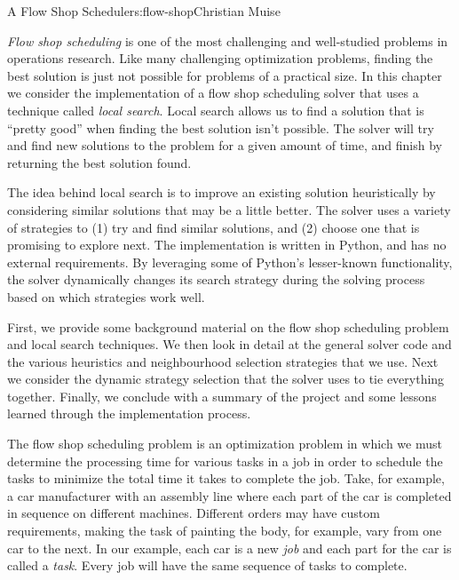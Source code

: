 \begin{aosachapter}{A Flow Shop Scheduler}{s:flow-shop}{Christian Muise}

\label{a-flow-shop-scheduler}

\emph{Flow shop scheduling} is one of the most challenging and
well-studied problems in operations research. Like many challenging
optimization problems, finding the best solution is just not possible
for problems of a practical size. In this chapter we consider the
implementation of a flow shop scheduling solver that uses a technique
called \emph{local search}. Local search allows us to find a solution
that is ``pretty good'' when finding the best solution isn't possible.
The solver will try and find new solutions to the problem for a given
amount of time, and finish by returning the best solution found.

The idea behind local search is to improve an existing solution
heuristically by considering similar solutions that may be a little
better. The solver uses a variety of strategies to (1) try and find
similar solutions, and (2) choose one that is promising to explore next.
The implementation is written in Python, and has no external
requirements. By leveraging some of Python's lesser-known functionality,
the solver dynamically changes its search strategy during the solving
process based on which strategies work well.

First, we provide some background material on the flow shop scheduling
problem and local search techniques. We then look in detail at the
general solver code and the various heuristics and neighbourhood
selection strategies that we use. Next we consider the dynamic strategy
selection that the solver uses to tie everything together. Finally, we
conclude with a summary of the project and some lessons learned through
the implementation process.

\label{background}

\label{flow-shop-scheduling}

The flow shop scheduling problem is an optimization problem in which we
must determine the processing time for various tasks in a job in order
to schedule the tasks to minimize the total time it takes to complete
the job. Take, for example, a car manufacturer with an assembly line
where each part of the car is completed in sequence on different
machines. Different orders may have custom requirements, making the task
of painting the body, for example, vary from one car to the next. In our
example, each car is a new \emph{job} and each part for the car is
called a \emph{task}. Every job will have the same sequence of tasks to
complete.


\end{aosachapter}

